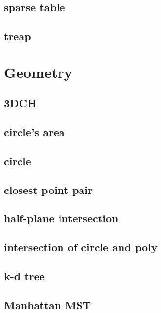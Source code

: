 \documentclass[a4paper,5pt,twocolumn,titlepage]{article}
\begin{document}
\subsection{sparse table}

\subsection{treap}


\section{Geometry}

\subsection{3DCH}

\subsection{circle's area}

\subsection{circle}

\subsection{closest point pair}

\subsection{half-plane intersection}

\subsection{intersection of circle and poly}

\subsection{k-d tree}

\subsection{Manhattan MST}

\end{document}
